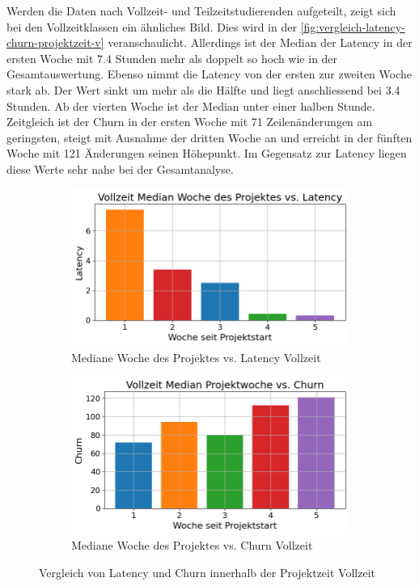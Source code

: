 Werden die Daten nach Vollzeit- und Teilzeitstudierenden aufgeteilt, zeigt sich bei den Vollzeitklassen ein ähnliches Bild. Dies wird in der \autoref{fig:vergleich-latency-churn-projektzeit-v} veranschaulicht. Allerdings ist der Median der Latency in der ersten Woche mit 7.4 Stunden mehr als doppelt so hoch wie in der Gesamtauswertung. Ebenso nimmt die Latency von der ersten zur zweiten Woche stark ab. Der Wert sinkt um mehr als die Hälfte und liegt anschliessend bei 3.4 Stunden. Ab der vierten Woche ist der Median unter einer halben Stunde. Zeitgleich ist der Churn in der ersten Woche mit 71 Zeilenänderungen am geringsten, steigt mit Ausnahme der dritten Woche an und erreicht in der fünften Woche mit 121 Änderungen seinen Höhepunkt. Im Gegensatz zur Latency liegen diese Werte sehr nahe bei der Gesamtanalyse.
\begin{figure}[htbp]
    \centering
    \begin{subfigure}[b]{0.48\textwidth}
        \centering
        \includegraphics[width=\textwidth]{Figures/mittelwert-woche-lateny-v.png}
        \caption{Mediane Woche des Projektes vs. Latency Vollzeit}
        \label{fig:mittelwert-woche-lateny-v}
    \end{subfigure}
    \hfill
    \begin{subfigure}[b]{0.48\textwidth}
        \centering
        \includegraphics[width=\textwidth]{Figures/mittelwert-woche-churn-v.png}
        \caption{Mediane Woche des Projektes vs. Churn Vollzeit}
        \label{fig:mittelwert-woche-churn-v}
    \end{subfigure}
    \caption{Vergleich von Latency und Churn innerhalb der Projektzeit Vollzeit}
    \label{fig:vergleich-latency-churn-projektzeit-v}
\end{figure}

